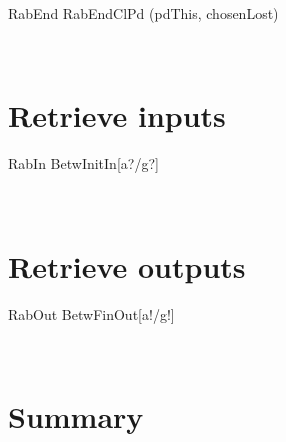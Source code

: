 \begin{LSDef}
\begin{zed}
  RabEnd  RabEndClPd \hide (pdThis, chosenLost)
\end{zed}~\end{LSDef}

\section{Retrieve inputs}

\begin{LSDef}
\begin{zed}
  RabIn  BetwInitIn[a?/g?]
\end{zed}~\end{LSDef}

\section{Retrieve outputs}

\begin{LSDef}
\begin{zed}
  RabOut  BetwFinOut[a!/g!]
\end{zed}~\end{LSDef}

\newpage

\section{Summary}\label{ch10.summary}

\ldefsummary %
\lthmsummary %
\lthmaddeddefsummary %
\lthmaddedthmsummary %
\lzevessummary
